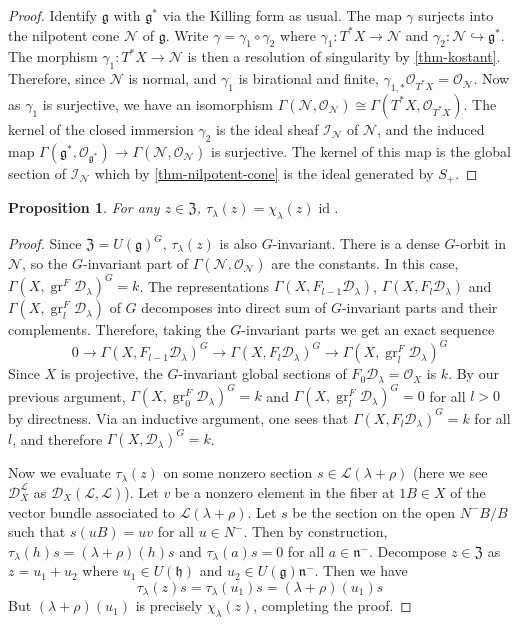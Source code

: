 \documentclass[11pt, a4paper]{article}
\newtheorem{proposition}[theorem]{Proposition}
\theoremstyle{definition}
\newcommand{\gr}{\operatorname{gr}}
\newcommand{\id}[0]{\operatorname{id}}
\newcommand{\h}{\mathfrak h}
\newcommand{\g}{\mathfrak g}
\begin{document}
    \begin{proof}
        Identify $\g$ with $\g^*$ via the Killing form as usual. The map $\gamma$ surjects into the nilpotent cone $\mathscr N$ of $\g$. Write $\gamma=\gamma_1\circ\gamma_2$ where $\gamma_1:T^*X\to\mathscr N$ and $\gamma_2:\mathscr N\hookrightarrow\g^*$. The morphism $\gamma_1:T^*X\to\mathscr N$ is then a resolution of singularity by \cref{thm-kostant}. Therefore, since $\mathscr N$ is normal, and $\gamma_1$ is birational and finite, $\gamma_{1, *}\mathcal O_{T^*X}=\mathcal O_{\mathscr N}$. Now as $\gamma_1$ is surjective, we have an isomorphism $\Gamma(\mathscr N, \mathcal O_{\mathscr N})\cong \Gamma(T^*X, \mathcal O_{T^*X})$. The kernel of the closed immersion $\gamma_2$ is the ideal sheaf $\mathcal I_{\mathscr N}$ of $\mathscr N$, and the induced map $\Gamma(\g^*, \mathcal O_{\g^*})\to \Gamma(\mathscr N,\mathcal O_{\mathscr N})$ is surjective. The kernel of this map is the global section of $\mathcal I_{\mathscr N}$ which by \cref{thm-nilpotent-cone} is the ideal generated by $S_+$.
    \end{proof}
    \begin{proposition}
        For any $z\in\mathfrak Z$, $\tau_\lambda(z)=\chi_{\lambda}(z)\id$.
    \end{proposition}
    \begin{proof}
        Since $\mathfrak Z=U(\g)^G$, $\tau_\lambda(z)$ is also $G$-invariant. There is a dense $G$-orbit in $\mathscr N$, so the $G$-invariant part of $\Gamma(\mathscr N,\mathcal O_{\mathscr N})$ are the constants. In this case, $\Gamma(X, \gr^F \mathcal D_\lambda)^G=k$. The representations $\Gamma(X, F_{l-1}\mathcal D_\lambda)$, $\Gamma(X, F_{l}\mathcal D_\lambda)$ and $\Gamma(X, \gr_l^F\mathcal D_\lambda)$ of $G$ decomposes into direct sum of $G$-invariant parts and their complements. Therefore, taking the $G$-invariant parts we get an exact sequence
        \[0\to\Gamma(X, F_{l-1}\mathcal D_\lambda)^G\to\Gamma(X, F_{l}\mathcal D_\lambda)^G\to\Gamma(X, \gr_l^F\mathcal D_\lambda)^G\]
        Since $X$ is projective, the $G$-invariant global sections of $F_0\mathcal D_\lambda=\mathcal O_X$ is $k$. By our previous argument, $\Gamma(X, \gr^F_0\mathcal D_\lambda)^G=k$ and $\Gamma(X, \gr^F_l\mathcal D_\lambda)^G=0$ for all $l>0$ by directness. Via an inductive argument, one sees that $\Gamma(X, F_{l}\mathcal D_\lambda)^G=k$ for all $l$, and therefore $\Gamma(X, \mathcal D_\lambda)^G=k$.

        Now we evaluate $\tau_\lambda(z)$ on some nonzero section $s\in\mathcal L(\lambda+\rho)$ (here we see $\mathcal D_X^{\mathcal L}$ as $\mathcal D_X(\mathcal L,\mathcal L)$). Let $v$ be a nonzero element in the fiber at $1B\in X$ of the vector bundle associated to $\mathcal L(\lambda+\rho)$. Let $s$ be the section on the open $N^-B/B$ such that $s(uB)=uv$ for all $u\in N^-$. Then by construction, $\tau_\lambda(h)s=(\lambda+\rho)(h)s$ and $\tau_\lambda(a)s=0$ for all $a\in\mathfrak n^-$. Decompose $z\in\mathfrak Z$ as $z=u_1+u_2$ where $u_1\in U(\h)$ and $u_2\in U(\g)\mathfrak n^-$. Then we have
        \[\tau_\lambda(z)s=\tau_\lambda(u_1)s=(\lambda+\rho)(u_1)s\]
        But $(\lambda+\rho)(u_1)$ is precisely $\chi_\lambda(z)$, completing the proof.
    \end{proof}
\end{document}
